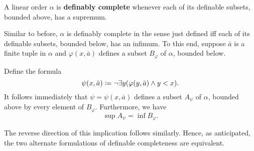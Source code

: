 \begin{dfn}
	A linear order $\alpha$ is \textbf{definably complete} whenever each of its
	definable subsets, bounded above, has a supremum.
\end{dfn}

Similar to before, $\alpha$ is definably complete in the sense just defined iff
each of its definable subsets, bounded below, has an infimum.  To this end,
suppose $\bar{a}$ is a finite tuple in $\alpha$ and $\varphi(x,\bar{a})$ defines
a subset $B_{\varphi}$ of $\alpha$, bounded below.

Define the formula
\begin{equation}
	\psi(x,\bar{a})\coloneqq\neg\exists y(\varphi(y,\bar{a})\wedge y<x).
\end{equation}
It follows immediately that $\psi=\psi(x,\bar{a})$ defines a subset $A_{\psi}$
of $\alpha$, bounded above by every element of $B_{\varphi}$.  Furthermore, we
have
\begin{equation}
	\sup A_{\psi}=\inf B_{\varphi}.
\end{equation}

The reverse direction of this implication follows similarly.  Hence, as
anticipated, the two alternate formulations of definable completeness are
equivalent.

